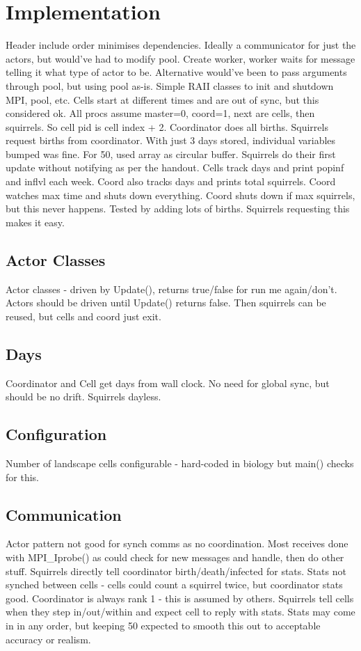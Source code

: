 \documentclass[11pt, oneside]{article}   %
\begin{document}
\newpage

\section{Implementation}
Header include order minimises dependencies.
Ideally a communicator for just the actors, but would've had to modify pool.
Create worker, worker waits for message telling it what type of actor to be.
Alternative would've been to pass arguments through pool, but using pool as-is.
Simple RAII classes to init and shutdown MPI, pool, etc.
Cells start at different times and are out of sync, but this considered ok.
All procs assume master=0, coord=1, next are cells, then squirrels.
So cell pid is cell index + 2.
Coordinator does all births.
Squirrels request births from coordinator.
With just 3 days stored, individual variables bumped was fine.
For 50, used array as circular buffer.
Squirrels do their first update without notifying as per the handout.
Cells track days and print popinf and inflvl each week.
Coord also tracks days and prints total squirrels.
Coord watches max time and shuts down everything.
Coord shuts down if max squirrels, but this never happens.  Tested by adding lots of births.  Squirrels requesting this makes it easy.


\subsection{Actor Classes}
Actor classes - driven by Update(), returns true/false for run me again/don't.
Actors should be driven until Update() returns false.
Then squirrels can be reused, but cells and coord just exit.


\subsection{Days}
Coordinator and Cell get days from wall clock.
No need for global sync, but should be no drift.
Squirrels dayless. 

\subsection{Configuration}
Number of landscape cells configurable - hard-coded in biology but main() checks for this.

\subsection{Communication}
Actor pattern not good for synch comms as no coordination.
Most receives done with MPI\_Iprobe() as could check for new messages and handle, then do other stuff.
Squirrels directly tell coordinator birth/death/infected for stats.
Stats not synched between cells - cells could count a squirrel twice, but coordinator stats good.
Coordinator is always rank 1 - this is assumed by others.
Squirrels tell cells when they step in/out/within and expect cell to reply with stats.
Stats may come in in any order, but keeping 50 expected to smooth this out to acceptable accuracy or realism.
\end{document}
